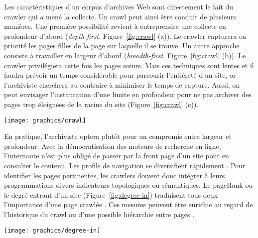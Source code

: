 \documentclass[symmetric,justified,marginals=raggedouter]{tufte-book}
\begin{document}
Les caractéristiques d'un corpus d'archives Web sont directement le fait du crawler qui a mené la collecte. Un crawl peut ainsi être conduit de plusieurs manières. Une première possibilité revient à entreprendre une collecte en profondeur d'abord (\textit{depth-first}, Figure~\ref{fig:crawl} (a)). Le crawler capturera en priorité les pages filles de la page sur laquelle il se trouve. Un autre approche consiste à travailler en largeur d'abord (\textit{breadth-first}, Figure~\ref{fig:crawl} (b)). Le crawler privilégiera cette fois les pages sœurs. Mais ces techniques sont lentes et il faudra prévoir un temps considérable pour parcourir l'entièreté d'un site, or l'archiviste cherchera au contraire à minimiser le temps de capture. Aussi, on peut envisager l'instauration d'une limite en profondeur pour ne pas archiver des pages trop éloignées de la racine du site (Figure~\ref{fig:crawl} (c)).

\begin{figure*}%
  \texttt{[image: graphics/crawl]}
  \caption{Différentes stratégies adoptées par un crawler $c$ pour collecter les pages $\{p_1,...p_n\}$ d'un même site}
  \label{fig:crawl}
\end{figure*}

\noindent En pratique, l'archiviste optera plutôt pour un compromis entre largeur et profondeur. Avec la démocratisation des moteurs de re\-cherche en ligne, l'internaute n'est plus obligé de passer par la front page d'un site pour en consulter le contenu. Les profils de navigation se diversifient rapidement \citep{holscher_web_2000}. Pour identifier les pages pertinentes, les crawlers doivent donc intégrer à leurs programmations divers indicateurs topologiques ou sémantiques. Le pageRank \citep{page_pagerank_1999} ou le degré entrant d'un site (Figure~\ref{fig:degree-in}) traduisent tous deux l'importance d'une page crawlée \citep{cho_efficient_1998}. Ces mesures peuvent être enrichie au regard de l'historique du crawl ou d'une possible hiérarchie entre pages \citep{baeza-yates_crawling_2005}. 

\begin{marginfigure}%
  \texttt{[image: graphics/degree-in]}
  \caption{Graphe dont les nœuds sont étiquetés par degré entrant. En théorie des graphes, le degré $deg^-(v)$ d'un nœud $v$ correspond au nombre de liens incidents entrant à ce nœud.}
  \label{fig:degree-in}
\end{marginfigure} 
\end{document}
